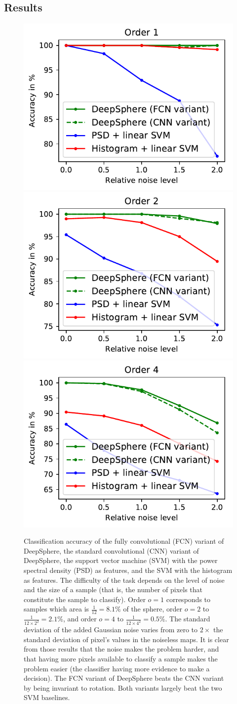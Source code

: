 \documentclass[final,twocolumn,3p,times,sort&compress]{elsarticle}
\newcommand{\1}{\b{1}}              %
\newcommand{\0}{\b{0}}              %
\begin{document}
\subsection{Results}

\begin{figure}
	\centering
	\includegraphics[width=0.32\linewidth]{result_order1}
	\hfill
	\includegraphics[width=0.32\linewidth]{result_order2}
	\hfill
	\includegraphics[width=0.32\linewidth]{result_order4}
	\caption{
		Classification accuracy of the fully convolutional (FCN) variant of DeepSphere, the standard convolutional (CNN) variant of DeepSphere, the support vector machine (SVM) with the power spectral density (PSD) as features, and the SVM with the histogram as features.
		The difficulty of the task depends on the level of noise and the size of a sample (that is, the number of pixels that constitute the sample to classify). Order $o=1$ corresponds to samples which area is $\frac{1}{12}=8.1\%$ of the sphere, order $o=2$ to $\frac{1}{12 \times 2^2} = 2.1\%$, and order $o=4$ to $\frac{1}{12 \times 4^2} = 0.5\%$. The standard deviation of the added Gaussian noise varies from zero to $2\times$ the standard deviation of pixel's values in the noiseless maps.
		It is clear from those results that the noise makes the problem harder, and that having more pixels available to classify a sample makes the problem easier (the classifier having more evidence to make a decision). The FCN variant of DeepSphere beats the CNN variant by being invariant to rotation. Both variants largely beat the two SVM baselines.
	}
	\label{fig:results}
\end{figure}
\end{document}
